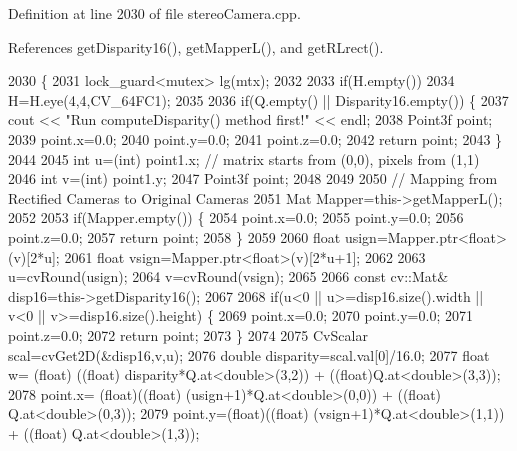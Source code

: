 Definition at line 2030 of file stereo\+Camera.\+cpp.



References get\+Disparity16(), get\+Mapper\+L(), and get\+R\+Lrect().


\begin{DoxyCode}
2030                                                                                   \{
2031     lock\_guard<mutex> lg(mtx);
2032 
2033     \textcolor{keywordflow}{if}(H.empty())
2034         H=H.eye(4,4,CV\_64FC1);
2035 
2036     \textcolor{keywordflow}{if}(Q.empty() || Disparity16.empty()) \{
2037         cout << \textcolor{stringliteral}{"Run computeDisparity() method first!"} << endl;
2038         Point3f point;
2039         point.x=0.0;
2040         point.y=0.0;
2041         point.z=0.0;
2042         \textcolor{keywordflow}{return} point;
2043     \}
2044 
2045     \textcolor{keywordtype}{int} u=(int) point1.x; \textcolor{comment}{// matrix starts from (0,0), pixels from (1,1)}
2046     \textcolor{keywordtype}{int} v=(\textcolor{keywordtype}{int}) point1.y;
2047     Point3f point;
2048 
2049 
2050     \textcolor{comment}{// Mapping from Rectified Cameras to Original Cameras}
2051     Mat Mapper=this->getMapperL();
2052 
2053     \textcolor{keywordflow}{if}(Mapper.empty()) \{
2054         point.x=0.0;
2055         point.y=0.0;
2056         point.z=0.0;
2057         \textcolor{keywordflow}{return} point;
2058     \}
2059 
2060     \textcolor{keywordtype}{float} usign=Mapper.ptr<\textcolor{keywordtype}{float}>(v)[2*u];
2061     \textcolor{keywordtype}{float} vsign=Mapper.ptr<\textcolor{keywordtype}{float}>(v)[2*u+1];
2062 
2063     u=cvRound(usign);
2064     v=cvRound(vsign);
2065 
2066     \textcolor{keyword}{const} cv::Mat& disp16=this->getDisparity16();
2067 
2068     \textcolor{keywordflow}{if}(u<0 || u>=disp16.size().width || v<0 || v>=disp16.size().height) \{
2069         point.x=0.0;
2070         point.y=0.0;
2071         point.z=0.0;
2072         \textcolor{keywordflow}{return} point;
2073     \}
2074 
2075     CvScalar scal=cvGet2D(&disp16,v,u);
2076     \textcolor{keywordtype}{double} disparity=scal.val[0]/16.0;
2077     \textcolor{keywordtype}{float} w= (float) ((\textcolor{keywordtype}{float}) disparity*Q.at<\textcolor{keywordtype}{double}>(3,2)) + ((float)Q.at<\textcolor{keywordtype}{double}>(3,3));
2078     point.x= (float)((\textcolor{keywordtype}{float}) (usign+1)*Q.at<\textcolor{keywordtype}{double}>(0,0)) + ((\textcolor{keywordtype}{float}) Q.at<\textcolor{keywordtype}{double}>(0,3));
2079     point.y=(float)((\textcolor{keywordtype}{float}) (vsign+1)*Q.at<\textcolor{keywordtype}{double}>(1,1)) + ((\textcolor{keywordtype}{float}) Q.at<\textcolor{keywordtype}{double}>(1,3));

\end{DoxyCode}
